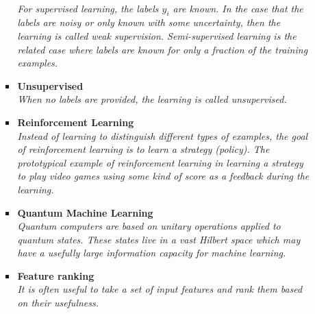 \documentclass[12pt,letterpaper]{article}
\begin{document}
\begin{itemize}
\begin{itemize}
\begin{itemize}
				\\\textit{For supervised learning, the labels $y_i$ are known.  In the case that the labels are noisy or only known with some uncertainty, then the learning is called weak supervision.  Semi-supervised learning is the related case where labels are known for only a fraction of the training examples.}
				\item \textbf{Unsupervised}~\cite{Chowdhury:2025mul,Coradin:2025ees,Katel:2024ygn,Sheldon:2024sbe,Cai:2024xnt,Lu:2024ict,Kishimoto:2023cys,Badea:2023jdb,Kitouni:2023rct,Huang:2023kgs,Dillon:2021gag,Howard:2021pos,Cai:2020vzx,Dillon:2019cqt,1797846,Komiske:2019fks,Mackey:2015hwa}
                                  \\\textit{When no labels are provided, the learning is called unsupervised.}
				\item \textbf{Reinforcement Learning}~\cite{Nishimura:2024apb,Angloher:2023oya,Alvestad:2023jgl,Nishimura:2023wdu,Dersy:2022bym,Windisch:2021mem,Cranmer:2021gdt,Harvey:2021oue,John:2020sak,Brehmer:2020brs,Carrazza:2019efs}
				\\\textit{Instead of learning to distinguish different types of examples, the goal of reinforcement learning is to learn a strategy (policy).  The prototypical example of reinforcement learning in learning a strategy to play video games using some kind of score as a feedback during the learning.}
				\item \textbf{Quantum Machine Learning}~\cite{Duffy:2025hsl,Bal:2025ydm,Hammad:2024dsn,Scott:2024txs,Yang:2024bqw,Nelakurti:2024xol,Zhang:2024ebl,Lazar:2024luq,Chen:2024rna,Hoque:2023zjt,Hammad:2023wme,Rehm:2023ovj,Schuhmacher:2023pro,Wozniak:2023xbe,Rousselot:2023pcj,Duckett:2022ccc,Araz:2022zxk,Peixoto:2022zzk,Alvi:2022fkk,Delgado:2022aty,Araz:2022haf,Abel:2022lqr,Gianelle:2022unu,Ngairangbam:2021yma,Kim:2021wrr,Bravo-Prieto:2021ehz,Araz:2021ifk,Belis:2021zqi,Wu:2021xsj,Heredge:2021vww,Blance:2021gcs,Chen:2021ouz,Guan:2020bdl,Wu:2020cye,Chen:2020zkj,Terashi:2020wfi,Blance:2020nhl,Zlokapa:2019lvv,Mott:2017xdb}
				\\\textit{Quantum computers are based on unitary operations applied to quantum states.  These states live in a vast Hilbert space which may have a usefully large information capacity for machine learning.}
				\item \textbf{Feature ranking}~\cite{Das:2022cjl,Grojean:2020ech,Faucett:2020vbu}
				\\\textit{It is often useful to take a set of input features and rank them based on their usefulness.}

\end{itemize}
\end{itemize}
\end{itemize}
\end{document}
